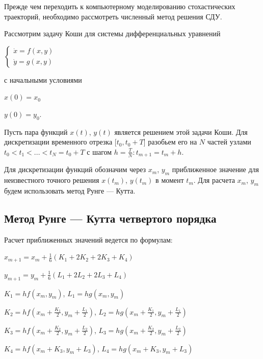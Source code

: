 \documentclass[a4paper, 14pt]{article}
\begin{document}
			Прежде чем переходить к компьютерному моделированию стохастических траекторий, необходимо рассмотреть численный метод решения СДУ.
			
			Рассмотрим задачу Коши для системы дифференциальных	уравнений
			
			\begin{center}
				\begin{math}
					\begin{cases}
						\dot x = f(x, y) \\
						\dot y = g(x, y)
					\end{cases}
				\end{math}
			\end{center}
			
			с начальными условиями
			
			\begin{center}
				$x(0) = x_0$
				
				$y(0) = y_0$.
			\end{center}
			
			Пусть пара функций $x(t)$, $y(t)$ является решением этой задачи Коши. Для дискретизации временного отрезка [$t_0, t_0 + T$] разобьем его
			на $N$ частей узлами $t_0 < t_1 < ... < t_N = t_0 + T$ с шагом $h = \frac{T}{N}: t_{m+1} = t_m + h$.
			
			Для дискретизации функций обозначим через $x_m$,  $y_m$ приближенное значение для неизвестного точного решения $x(t_m)$, $y(t_m)$ в момент
			$t_m$. Для расчета $x_m$,  $y_m$ будем использовать метод Рунге — Кутта.
			
		\subsection{Метод Рунге — Кутта четвертого порядка}
			
			Расчет приближенных значений ведется по формулам:
			
			\begin{center}
				$x_{m+1} = x_m + \frac16 \left(K_1 + 2K_2 + 2K_3 + K_4\right)$
				
				$y_{m+1} = y_m + \frac16 \left(L_1 + 2L_2 + 2L_3 + L_4\right)$
				
				$K_1 = hf(x_m, y_m)$, 
				$L_1 = hg(x_m, y_m)$
				
				$K_2 = hf\left(x_m + \frac{K_1}{2}, y_m + \frac{L_1}{2}\right)$, 
				$L_2 = hg\left(x_m + \frac{K_1}{2}, y_m + \frac{L_1}{2}\right)$
				
				$K_3 = hf\left(x_m + \frac{K_2}{2}, y_m + \frac{L_2}{2}\right)$, 
				$L_3 = hg\left(x_m + \frac{K_2}{2}, y_m + \frac{L_2}{2}\right)$
				
				$K_4 = hf\left(x_m + K_3, y_m + L_3\right)$, 
				$L_4 = hg\left(x_m + K_3, y_m + L_3\right)$
			\end{center}
			
\end{document}
